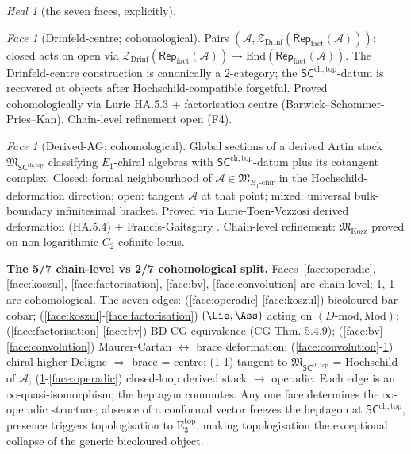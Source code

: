 \documentclass{article}
\theoremstyle{definition}
\theoremstyle{remark}
\newtheorem{heal}[theorem]{Heal}
\newtheorem{face}[theorem]{Face}
\newcommand{\SCchtop}{\mathsf{SC}^{\mathrm{ch,top}}}
\newcommand{\Etop}[1]{\mathrm{E}_{#1}^{\mathrm{top}}}
\newcommand{\cA}{\mathcal{A}}
\newcommand{\Rep}{\mathsf{Rep}}
\newcommand{\Drinf}{\mathcal{Z}_{\mathrm{Drinf}}}
\begin{document}
\begin{heal}[the seven faces, explicitly]
\begin{face}[Drinfeld-centre;
cohomological]\label{face:drinfeld}
Pairs $(\cA, \Drinf(\Rep_{\mathrm{fact}}(\cA)))$: closed acts on open
via $\Drinf(\Rep_{\mathrm{fact}}(\cA))\to
\mathrm{End}(\Rep_{\mathrm{fact}}(\cA))$. The Drinfeld-centre
construction is canonically a $2$-category; the $\SCchtop$-datum is
recovered at objects after Hochschild-compatible forgetful. Proved
cohomologically via Lurie HA.5.3 + factorisation centre
(Barwick--Schommer-Pries--Kan). Chain-level refinement open (F4).
\end{face}

\begin{face}[Derived-AG; cohomological]\label{face:derived-ag}
Global sections of a derived Artin stack $\mathfrak{M}_{\SCchtop}$
classifying $E_1$-chiral algebras with $\SCchtop$-datum plus its
cotangent complex. Closed: formal neighbourhood of
$\cA\in\mathfrak{M}_{E_1\text{-}\mathrm{chir}}$ in the
Hochschild-deformation direction; open: tangent $\cA$ at that point;
mixed: universal bulk-boundary infinitesimal bracket. Proved via
Lurie-Toen-Vezzosi derived deformation ($\mathrm{HA}$.5.4) +
Francis-Gaitsgory \cite{FG11}. Chain-level refinement:
$\mathfrak{M}_{\mathrm{Kosz}}$ proved on non-logarithmic $C_2$-cofinite
locus.
\end{face}

\textbf{The 5/7 chain-level vs 2/7 cohomological split.}
Faces~\ref{face:operadic}, \ref{face:koszul},
\ref{face:factorisation}, \ref{face:bv}, \ref{face:convolution} are
chain-level; \ref{face:drinfeld}, \ref{face:derived-ag} are
cohomological. The seven edges: (\ref{face:operadic}-\ref{face:koszul})
bicoloured bar-cobar; (\ref{face:koszul}-\ref{face:factorisation})
$(\Lie,\Ass)$ acting on $(D\text{-}\mathrm{mod},\mathrm{Mod})$;
(\ref{face:factorisation}-\ref{face:bv}) BD-CG equivalence (CG Thm.
5.4.9); (\ref{face:bv}-\ref{face:convolution}) Maurer-Cartan
$\leftrightarrow$ brace deformation; (\ref{face:convolution}-\ref{face:drinfeld})
chiral higher Deligne $\Rightarrow$ brace = centre;
(\ref{face:drinfeld}-\ref{face:derived-ag}) tangent to
$\mathfrak{M}_{\SCchtop}$ = Hochschild of $\cA$;
(\ref{face:derived-ag}-\ref{face:operadic}) closed-loop derived stack
$\to$ operadic. Each edge is an $\infty$-quasi-isomorphism; the
heptagon commutes. Any one face determines the $\infty$-operadic
structure; absence of a conformal vector freezes the heptagon at
$\SCchtop$, presence triggers topologisation to $\Etop{3}$, making
topologisation the exceptional collapse of the generic bicoloured
object.
\end{heal}
\end{document}
